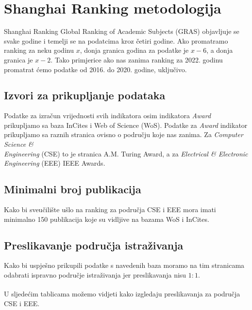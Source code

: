 \documentclass[times, utf8, zavrsni]{fer}
\begin{document}
\chapter{Shanghai Ranking metodologija}
Shanghai Ranking Global Ranking of Academic Subjects (GRAS) objavljuje se svake godine i temelji se na podatcima kroz četiri godine.
Ako  promatramo ranking za neku godinu $x$,
donja granica godina za podatke je $x-6$, a donja granica je $x-2$. Tako primjerice ako nas zanima ranking za 2022. godinu promatrat ćemo podatke od 2016. do 2020. godine, uključivo.

\section{Izvori za prikupljanje podataka}
Podatke za izračun vrijednosti svih indikatora osim indikatora \emph{Award} prikupljamo sa baza InCites i Web of Science (WoS). 
Podatke za \emph{Award} indikator prikupljamo sa raznih stranica ovisno o području koje nas zanima.
Za \emph{Computer Science \& \\Engineering} (CSE) to je stranica A.M. Turing Award, a za \emph{Electrical \& Electronic Engineering} (EEE) IEEE Awards.

\section{Minimalni broj publikacija} Kako bi sveučilište ušlo na ranking za područja CSE i EEE mora imati minimalno 150 publikacija koje su vidljive 
na bazama WoS i InCites.
\\ \section{Preslikavanje područja istraživanja}Kako bi uspješno prikupili podatke s navedenih baza moramo na tim stranicama odabrati ispravno područje istraživanja jer preslikavanja nisu $1:1$.
\\\\U sljedećim tablicama možemo vidjeti kako izgledaju preslikavanja za područja CSE i EEE.
\end{document}
